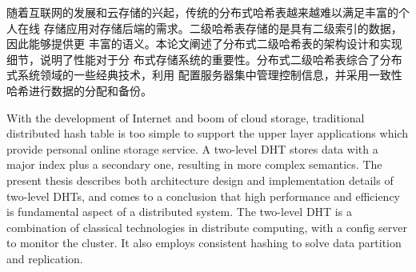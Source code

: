 
\begin{cabstract}
随着互联网的发展和云存储的兴起，传统的分布式哈希表越来越难以满足丰富的个人在线
存储应用对存储后端的需求。二级哈希表存储的是具有二级索引的数据，因此能够提供更
丰富的语义。本论文阐述了分布式二级哈希表的架构设计和实现细节，说明了性能对于分
布式存储系统的重要性。分布式二级哈希表综合了分布式系统领域的一些经典技术，利用
配置服务器集中管理控制信息，并采用一致性哈希进行数据的分配和备份。
\end{cabstract}


\begin{eabstract} 
With the development of Internet and boom of cloud storage, traditional
distributed hash table is too simple to support the upper layer applications
which provide personal online storage service. A two-level DHT stores data
with a major index plus a secondary one, resulting in more complex semantics.
The present thesis describes both architecture design and implementation
details of two-level DHTs, and comes to a conclusion that high performance and
efficiency is fundamental aspect of a distributed system. The two-level DHT is
a combination of classical technologies in distribute computing, with a config
server to monitor the cluster. It also employs consistent hashing to solve
data partition and replication.
\end{eabstract}

